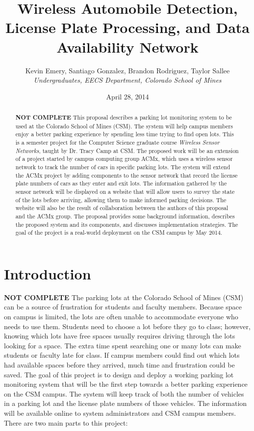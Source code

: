 \documentclass[11pt, oneside, fullpage, doublespace]{article}
\title{Wireless Automobile Detection, License Plate Processing, and Data Availability Network}
\author{Kevin Emery, Santiago Gonzalez, Brandon Rodriguez, Taylor Sallee\\ \emph{Undergraduates, EECS Department, Colorado School of Mines}}
\date{April 28, 2014}
\begin{document}
\maketitle

\begin{abstract}
{\color{red}\textbf{NOT COMPLETE}}
This proposal describes a parking lot monitoring system to be used at the Colorado School of Mines (CSM). The system will help campus members enjoy a better parking experience by spending less time trying to find open lots. This is a semester project for the Computer Science graduate course \emph{Wireless Sensor Networks}, taught by Dr. Tracy Camp at CSM. The proposed work will be an extension of a project started by campus computing group ACMx, which uses a wireless sensor network to track the number of cars in specific parking lots. The system will extend the ACMx project by adding components to the sensor network that record the license plate numbers of cars as they enter and exit lots. The information gathered by the sensor network will be displayed on a website that will allow users to survey the state of the lots before arriving, allowing them to make informed parking decisions. The website will also be the result of collaboration between the authors of this proposal and the ACMx group. The proposal provides some background information, describes the proposed system and its components, and discusses implementation strategies. The goal of the project is a real-world deployment on the CSM campus by May 2014.
\end{abstract}


\section{Introduction}
{\color{red}\textbf{NOT COMPLETE}}
The parking lots at the Colorado School of Mines (CSM) can be a source of frustration for students and faculty members. Because space on campus is limited, the lots are often unable to accommodate everyone who needs to use them. Students need to choose a lot before they go to class; however, knowing which lots have free spaces usually requires driving through the lots looking for a space. The extra time spent searching one or many lots can make students or faculty late for class. If campus members could find out which lots had available spaces before they arrived, much time and frustration could be saved. The goal of this project is to design and deploy a working parking lot monitoring system that will be the first step towards a better parking experience on the CSM campus. The system will keep track of both the number of vehicles in a parking lot and the license plate numbers of those vehicles. The information will be available online to system administrators and CSM campus members. There are two main parts to this project:
\end{document}
